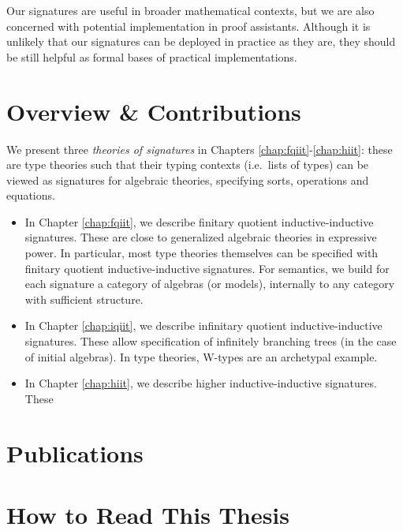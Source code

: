 \documentclass[12pt,a4paper,twoside,openany]{book}
\theoremstyle{remark}
\theoremstyle{definition}
\theoremstyle{theorem}
\begin{document}
Our signatures are useful in broader mathematical contexts, but we are also
concerned with potential implementation in proof assistants. Although it is
unlikely that our signatures can be deployed in practice as they are, they
should be still helpful as formal bases of practical implementations.

\section{Overview \& Contributions}


We present three \emph{theories of signatures} in Chapters
\ref{chap:fqiit}-\ref{chap:hiit}: these are type theories such that their typing
contexts (i.e.\ lists of types) can be viewed as signatures for algebraic
theories, specifying sorts, operations and equations.
\begin{itemize}
\item In Chapter \ref{chap:fqiit}, we describe finitary quotient
      inductive-inductive signatures. These are close to generalized algebraic
      theories \cite{gat} in expressive power. In particular, most type theories
      themselves can be specified with finitary quotient inductive-inductive
      signatures. For semantics, we build for each signature a category of algebras
      (or models), internally to any category with sufficient structure.
\item In Chapter \ref{chap:iqiit}, we describe infinitary quotient
      inductive-inductive signatures. These allow specification of infinitely
      branching trees (in the case of initial algebras). In type theories, W-types
      are an archetypal example.
\item In Chapter \ref{chap:hiit}, we describe higher inductive-inductive signatures.
      These

\end{itemize}

\section{Publications}

\section{How to Read This Thesis}
\end{document}
